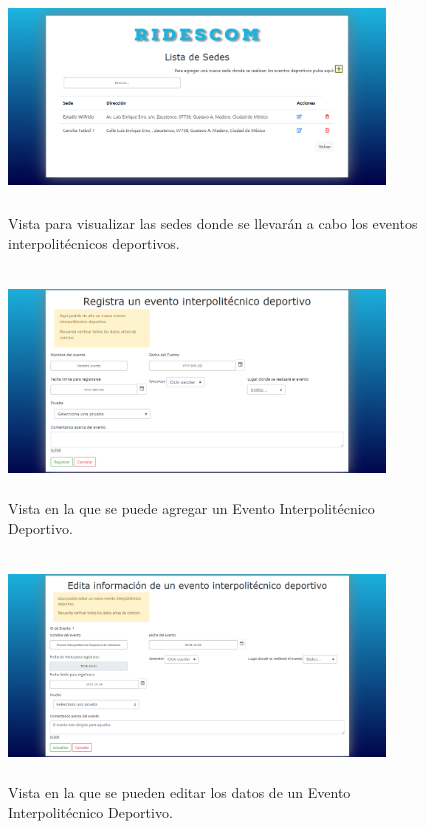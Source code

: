 	
		\begin{figure} [hbt!]
			\centering
			\includegraphics[width=10cm, height=6cm]{Imagenes/Vistas/Vista9_SedesJFD}
			\caption{Vista para visualizar las sedes donde se llevarán a cabo los eventos interpolitécnicos deportivos.}
			\label{VistaSedes}
		\end{figure}
		
		\begin{figure} [hbt!]
			\centering
			\includegraphics[width=10cm, height=6cm]{Imagenes/Vistas/Vista10_AgregaEvento}
			\caption{Vista en la que se puede agregar un Evento Interpolitécnico Deportivo.}
			\label{VistaAgregarEvento}
		\end{figure}
	
		\begin{figure} [hbt!]
			\centering
			\includegraphics[width=10cm, height=6cm]{Imagenes/Vistas/Vista11_EditarEvento}
			\caption{Vista en la que se pueden editar los datos de un Evento Interpolitécnico Deportivo.}
			\label{VistaEditarEvento}
		\end{figure}
		
